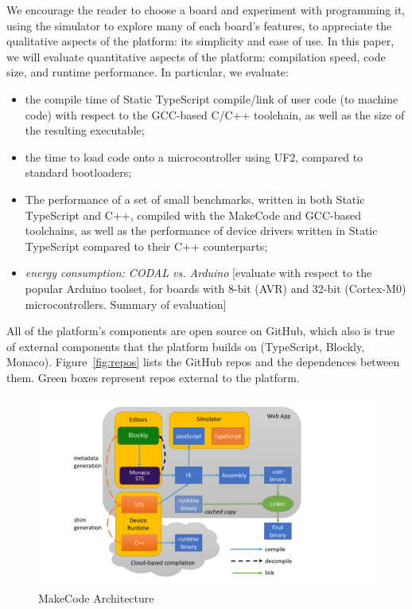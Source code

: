 We encourage the reader to choose a board and experiment with programming it, using the simulator to explore many 
of each board's features, to appreciate the qualitative aspects of the platform: its simplicity and ease of use.  In this 
paper, we will evaluate quantitative aspects of the platform: 
compilation speed, code size, and runtime performance.  In particular, we evaluate:
\begin{itemize}
\item the compile time of Static TypeScript compile/link of user code (to machine code) with respect 
      to the GCC-based C/C++ toolchain, as well as the size of the resulting executable;
\item the time to load code onto a microcontroller using UF2, compared to standard bootloaders; 
\item The performance of a set of small benchmarks, written in both Static TypeScript and C++,
      compiled with the MakeCode and GCC-based toolchains, as well as the performance of device drivers
      written in Static TypeScript compared to their C++ counterparts;
\item \emph{energy consumption: CODAL vs. Arduino}
[evaluate with respect to the popular Arduino toolset, for boards with 8-bit (AVR) and 32-bit (Cortex-M0) microcontrollers. 
Summary of evaluation]
\end{itemize}

All of the platform's components are open source on GitHub, 
which also is true of external components that the platform
builds on (TypeScript, Blockly, Monaco). Figure~\ref{fig:repos}
lists the GitHub repos and the dependences between them. Green
boxes represent repos external to the platform.

\begin{figure}[t]
      \includegraphics[width=5.5in]{makecodeFig.pdf}
  \caption{\label{fig:makecode}MakeCode Architecture}
  \end{figure}
  

